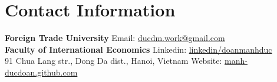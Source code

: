 \section{\sc Contact Information}
{\bf Foreign Trade University}     \hfill  Email: \href{mailto:ducdm.work@gmail.com}{ducdm.work@gmail.com}\\
{\bf Faculty of International Economics}  	 		\hfill Linkedin: \href{https://www.linkedin.com/in/doanmanhduc/}{linkedin/doanmanhduc}\\
91 Chua Lang str., Dong Da dist., Hanoi, Vietnam \hfill Website: \href{https://ducecon01.github.io/manh-ducdoan.github.io/}{manh-ducdoan.github.com} \\
\\


